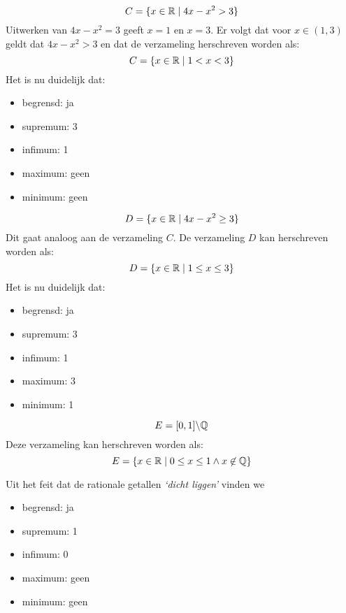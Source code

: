 \documentclass[week=1]{homework}
\begin{document}
\begin{questions}
        \[
	        C = \{ x \in \mathbb{R} \mid 4x - x^2 > 3 \}
        \]
        Uitwerken van $4x - x^2 = 3$ geeft $x = 1$ en $x = 3$. Er volgt dat voor $x \in (1,3)$ geldt dat $4x - x^2 > 3$ en dat de verzameling herschreven worden als:
        \[
	        C = \{x \in \mathbb{R} \mid 1 < x < 3 \}
        \]
        Het is nu duidelijk dat:              
              \begin{itemize}
              	\item begrensd: ja
              	\item supremum: 3
              	\item infimum: 1
              	\item maximum: geen
              	\item minimum: geen
              \end{itemize}
        
        \[
	        D = \{ x \in \mathbb{R} \mid 4x - x^2 \geq 3 \}
        \]
        Dit gaat analoog aan de verzameling $C$. De verzameling $D$ kan herschreven worden als:
        \[
	        D = \{x \in \mathbb{R} \mid 1 \leq x \leq 3 \}
        \]    
        Het is nu duidelijk dat:
              \begin{itemize}
              	\item begrensd: ja
              	\item supremum: 3
              	\item infimum: 1
              	\item maximum: 3
              	\item minimum: 1
              \end{itemize}
          
        \[
	        E = [0,1]\backslash \mathbb{Q}
        \]    
        Deze verzameling kan herschreven worden als:
        \[
	        E = \{x \in \mathbb{R} \mid 0 \leq x \leq 1 \wedge x \not\in \mathbb{Q} \}
        \]
        
        Uit het feit dat de rationale getallen \textit{`dicht liggen'} vinden we
              \begin{itemize}
              	\item begrensd: ja
              	\item supremum: 1
              	\item infimum: 0
              	\item maximum: geen
              	\item minimum: geen
              \end{itemize}
                     

\end{questions}
\end{document}
